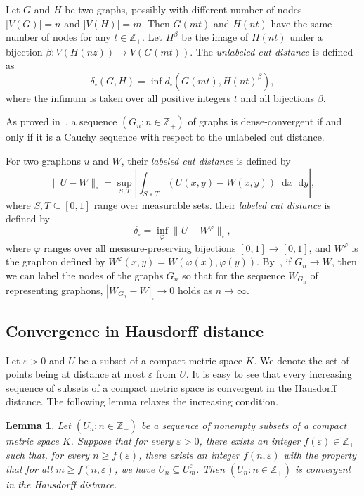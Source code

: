 \documentclass[10pt]{article}
\theoremstyle{plain}
\newtheorem{lem}[thm]{Lemma}
\theoremstyle{definition}
\newcommand*\diff{\mathop{}\!\mathrm{d}}
\newcommand{\bbZ}{\mathbb{Z}}
\newcommand{\eps}{\varepsilon}
\begin{document}
Let $G$ and $H$ be two graphs, possibly with different number of nodes $|V(G)|=n$ and $|V(H)|=m$. Then $G(mt)$ and $H(nt)$ have the same number of nodes for any $t\in\bbZ_+$. Let $H^\beta$ be the image of $H(nt)$ under a bijection $\beta\colon V(H(nz))\to V(G(mt))$. The {\it unlabeled cut distance} is defined as
\[
\delta_\square(G,H)=\inf d_\square(G(mt),H(nt)^\beta),
\]
where the infimum is taken over all positive integers $t$ and all bijections $\beta$.

As proved in~\cite{BCLSV1}, a sequence $(G_n\colon n\in\bbZ_+)$ of graphs is dense-convergent if and only if it is a Cauchy sequence with respect to the unlabeled cut distance.

For two graphons $u$ and $W$, their {\it labeled cut distance} is defined by
\[
\|U-W\|_\square=\sup_{S,T} \left|\int_{S\times T} (U(x,y)-W(x,y))\diff x\diff y\right|,
\]
where $S,T\subseteq[0,1]$ range over measurable sets. their {\it labeled cut distance} is defined by
\[
\delta_\square=\inf_\varphi \|U-W^\varphi\|_\square,
\]
where $\varphi$ ranges over all measure-preserving bijections $[0,1]\to[0,1]$, and $W^\varphi$ is the graphon defined by $W^\varphi(x,y)=W(\varphi(x),\varphi(y))$. By~\cite[Theorem 11.59]{lovasz2012large}, if $G_n\to W$, then we can label the nodes of the graphs $G_n$ so that for the sequence $W_{G_n}$ of representing graphons, $|W_{G_n}-W|_{\square}\to0$ holds as $n\to\infty$.

\subsection{Convergence in Hausdorff distance}
\label{sec:hausdorff}

Let $\varepsilon>0$ and $U$ be a subset of a compact metric space $K$. We denote the set of points being at distance at most $\varepsilon$ from $U$. It is easy to see that every increasing sequence of subsets of a compact metric space is convergent in the Hausdorff distance. The following lemma relaxes the increasing condition.

\begin{lem}\label{LEM:GROW-CONVERGE}
Let $(U_n\colon n\in\bbZ_+)$ be a sequence of nonempty subsets of a compact metric space $K$. Suppose that for every $\eps>0$, there exists an integer $f(\eps)\in\bbZ_+$ such that, for every $n\ge f(\eps)$, there exists an integer $f(n,\eps)$ with the property that for all $m\ge f(n,\eps)$, we have $U_n\subseteq U_m^\eps$. Then $(U_n\colon n\in\bbZ_+)$ is convergent in the Hausdorff distance.
\end{lem}
\end{document}
